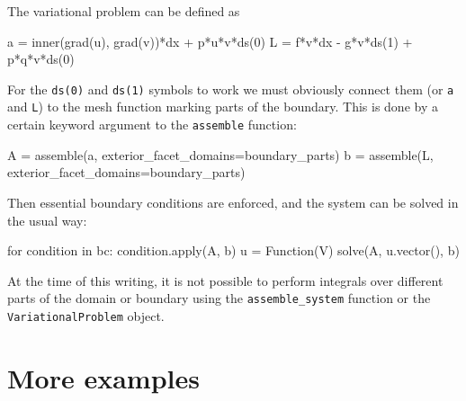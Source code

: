 The variational problem can be defined as
\begin{python}
a = inner(grad(u), grad(v))*dx + p*u*v*ds(0)
L = f*v*dx - g*v*ds(1) + p*q*v*ds(0)
\end{python}
For the {\fontsize{10pt}{10pt}\texttt{ds(0)}} and {\fontsize{10pt}{10pt}\texttt{ds(1)}} symbols to work we must obviously
connect them (or {\fontsize{10pt}{10pt}\texttt{a}} and {\fontsize{10pt}{10pt}\texttt{L}}) to the mesh function marking
parts of the boundary. This is done by a certain keyword argument
to the {\fontsize{10pt}{10pt}\texttt{assemble}} function:
\begin{python}
A = assemble(a, exterior_facet_domains=boundary_parts)
b = assemble(L, exterior_facet_domains=boundary_parts)
\end{python}
Then essential boundary conditions are enforced, and the system can
be solved in the usual way:
\begin{python}
for condition in bc: condition.apply(A, b)
u = Function(V)
solve(A, u.vector(), b)
\end{python}

At the time of this writing, it is not possible to perform integrals over
different parts of the domain or boundary using the
{\fontsize{10pt}{10pt}\verb!assemble_system!} function or the
{\fontsize{10pt}{10pt}\texttt{VariationalProblem}} object.



\section{More examples}

